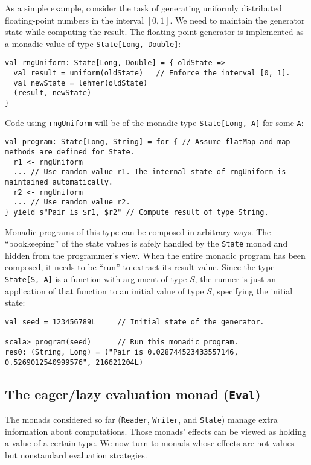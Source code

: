 As a simple example, consider the task of generating uniformly distributed
floating-point numbers in the interval $\left[0,1\right]$. We need
to maintain the generator state while computing the result. The floating-point
generator is implemented as a monadic value of type \lstinline!State[Long, Double]!:
\begin{lstlisting}
val rngUniform: State[Long, Double] = { oldState =>
  val result = uniform(oldState)   // Enforce the interval [0, 1].
  val newState = lehmer(oldState)
  (result, newState)
}
\end{lstlisting}
Code using \lstinline!rngUniform! will be of the monadic type \lstinline!State[Long, A]!
for some \lstinline!A!:
\begin{lstlisting}
val program: State[Long, String] = for { // Assume flatMap and map methods are defined for State.
  r1 <- rngUniform
  ... // Use random value r1. The internal state of rngUniform is maintained automatically.
  r2 <- rngUniform
  ... // Use random value r2.
} yield s"Pair is $r1, $r2" // Compute result of type String.
\end{lstlisting}

Monadic programs of this type can be composed in arbitrary ways. The
\textsf{``}bookkeeping\textsf{''} of the state values is safely handled by the \lstinline!State!
monad and hidden from the programmer\textsf{'}s view. When the entire monadic
program has been composed, it needs to be \textsf{``}run\textsf{''} to extract its
result value. Since the type \lstinline!State[S, A]! is a function
with argument of type $S$, the runner is just
an application of that function to an initial value of type $S$,
specifying the initial state:
\begin{lstlisting}
val seed = 123456789L     // Initial state of the generator.

scala> program(seed)      // Run this monadic program.
res0: (String, Long) = ("Pair is 0.028744523433557146, 0.5269012540999576", 216621204L)
\end{lstlisting}


\subsection{The eager/lazy evaluation monad (\texttt{Eval})\label{subsec:The-eager-lazy-evaluation-monad}}

The monads considered so far (\lstinline!Reader!, \lstinline!Writer!,
and \lstinline!State!) manage extra information about computations.
Those monads\textsf{'} effects can be viewed as holding a value of
a certain type. We now turn to monads whose effects are not values
but nonstandard evaluation strategies. 

